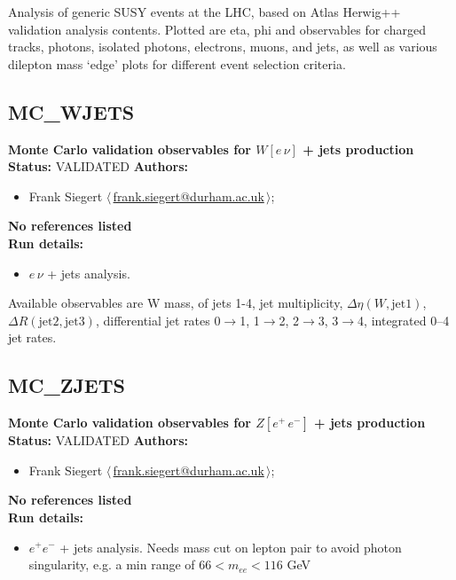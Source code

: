 \noindent Analysis of generic SUSY events at the LHC, based on Atlas Herwig++  validation analysis contents. Plotted are eta, phi and \pT observables  for charged tracks, photons, isolated photons, electrons, muons, and jets,  as well as various dilepton mass `edge' plots for different event selection  criteria.

\clearpage


\clearpage

\subsection{MC\_WJETS}
\textbf{Monte Carlo validation observables for $W[e \, \nu]$ + jets production}\newline
\textbf{Status:} VALIDATED\newline
\textbf{Authors:}
\begin{itemize}
  \item Frank Siegert $\langle\,$\href{mailto:frank.siegert@durham.ac.uk}{frank.siegert@durham.ac.uk}$\,\rangle$;
\end{itemize}
\textbf{No references listed}\\ 
\textbf{Run details:}
\begin{itemize}

  \item $e \, \nu$ + jets analysis.\end{itemize}

\noindent Available observables are W mass, \pT of jets 1-4, jet multiplicity, $\Delta\eta(W, \text{jet1})$, $\Delta R(\text{jet2}, \text{jet3})$,  differential jet rates 0\ensuremath{\to}1, 1\ensuremath{\to}2, 2\ensuremath{\to}3, 3\ensuremath{\to}4, integrated 0--4 jet  rates.

\clearpage


\clearpage

\subsection{MC\_ZJETS}
\textbf{Monte Carlo validation observables for $Z[e^+ \, e^-]$ + jets production}\newline
\textbf{Status:} VALIDATED\newline
\textbf{Authors:}
\begin{itemize}
  \item Frank Siegert $\langle\,$\href{mailto:frank.siegert@durham.ac.uk}{frank.siegert@durham.ac.uk}$\,\rangle$;
\end{itemize}
\textbf{No references listed}\\ 
\textbf{Run details:}
\begin{itemize}

  \item $e^+ e^-$ + jets analysis. Needs mass cut on lepton pair to avoid  photon singularity, e.g. a min range of $66 < m_{ee} < 116$ GeV\end{itemize}

